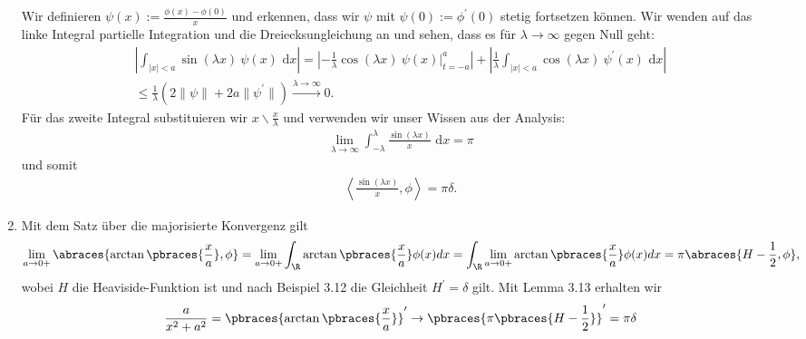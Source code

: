 \begin{solution}
\begin{enumerate}[label = (\roman*)]
Wir definieren $\psi(x) := \frac{\phi(x) - \phi(0)}{x}$ und erkennen, dass wir $\psi$ mit $\psi(0) := \phi^\prime(0)$ stetig fortsetzen können. Wir wenden auf das linke Integral partielle Integration und die Dreiecksungleichung an und sehen, dass es für $\lambda \rightarrow \infty$ gegen Null geht:
\begin{align}
\left|\int_{|x| < a} \sin(\lambda x) ~\psi(x) \text{~d}x\right|
=
\left|-\frac{1}{\lambda} \cos(\lambda x) ~ \psi(x) \Big|_{t=-a}^a \right| +
\left|\frac{1}{\lambda} \int_{|x| < a} \cos(\lambda x) ~\psi^\prime(x) \text{~d}x
\right| \\
\leq \frac{1}{\lambda} (2 \|\psi\| + 2a \|\psi^\prime\|)
\stackrel{\lambda \rightarrow \infty}{\longrightarrow} 0.
\end{align}
Für das zweite Integral substituieren wir $x \backslash \frac{x}{\lambda}$ und verwenden wir unser Wissen aus der Analysis:
\begin{align}
    \lim_{\lambda \rightarrow \infty} \int_{-\lambda}^{\lambda} \frac{\sin{(\lambda x)}}{x} \text{~d}x = \pi
\end{align}
und somit
\begin{align}
\left\langle \frac{\sin(\lambda x)}{x}, \phi\right\rangle = \pi\delta.
\end{align}
	\item Mit dem Satz über die majorisierte Konvergenz gilt
	\begin{align*}
	\lim_{a \to 0+}\abraces{\arctan\pbraces{\frac{x}{a}}, \phi} = \lim_{a \to 0+} \int_\R \arctan\pbraces{\frac{x}{a}} \phi(x) dx = \int_\R \lim_{a \to 0+} \arctan\pbraces{\frac{x}{a}} \phi(x) dx = \pi \abraces{H - \frac{1}{2}, \phi},
	\end{align*}
	wobei $H$ die Heaviside-Funktion ist und nach Beispiel 3.12 die Gleichheit $H^\prime = \delta$ gilt. Mit Lemma 3.13 erhalten wir
	\begin{align*}
	\frac{a}{x^2 + a^2} = \pbraces{\arctan\pbraces{\frac{x}{a}}}^\prime \to \pbraces{\pi\pbraces{H - \frac{1}{2}}}^\prime = \pi \delta
	\end{align*}
\end{enumerate}

\end{solution}

